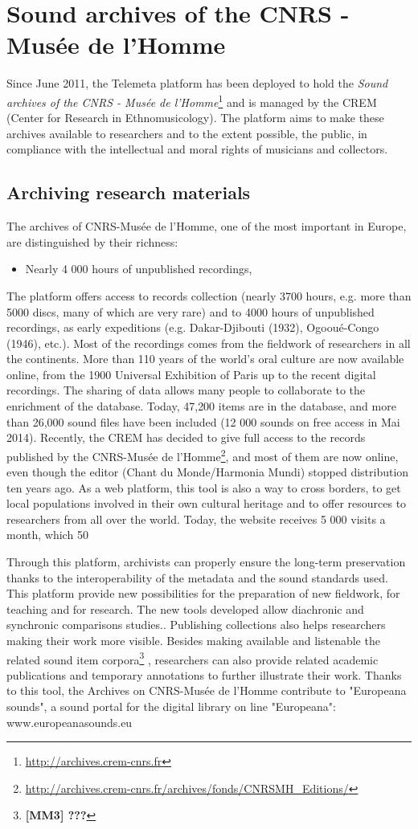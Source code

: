 \documentclass{sig-alternate}
\newcommand{\comment}[1]{\footnote{\color{red} \bf{{#1}}}}
\begin{document}
\section{Sound archives of the CNRS - Musée de l'Homme}\label{sec:archives-CREM}
Since June 2011, the Telemeta platform has been deployed to hold the \emph{Sound archives of the CNRS - Musée de l'Homme}\footnote{\url{http://archives.crem-cnrs.fr}} and is managed by the CREM (Center for Research in Ethnomusicology).
The platform aims to make these archives available to researchers and to the extent possible, the public, in compliance with the intellectual and moral rights of musicians and collectors.
\subsection{Archiving research materials}
The archives of CNRS-Musée de l’Homme, one of the most important in Europe, are distinguished by their richness:
\begin{itemize}
\item Nearly 4 000 hours of unpublished recordings,
\end{itemize}
The platform offers access to records collection (nearly 3700 hours, e.g. more than 5000 discs, many of which are very rare) and to 4000 hours of unpublished recordings, as early expeditions (e.g. Dakar-Djibouti (1932), Ogooué-Congo (1946), etc.). Most of the recordings comes from the fieldwork of researchers in all the continents. 
More than 110 years of the world's oral culture are now available online, from the 1900 Universal Exhibition of Paris up to the recent digital recordings. The sharing of data allows many people to collaborate to the enrichment of the database. Today, 47,200 items are in the database, and more than 26,000 sound files have been included (12 000 sounds on free access in Mai 2014). Recently, the CREM has decided to give full access to the records published by the CNRS-Musée de l’Homme\footnote{\url{http://archives.crem-cnrs.fr/archives/fonds/CNRSMH_Editions/}}, and most of them are now online, even though the editor (Chant du Monde/Harmonia Mundi) stopped distribution ten years ago. 
As a web platform, this tool is also a way to cross borders, to get local populations involved in their own cultural heritage and to offer resources to researchers from all over the world. Today, the website receives 5 000 visits a month, which 50%
 
Through this platform, archivists can properly ensure the long-term preservation thanks to the interoperability of the metadata and the sound standards used.
This platform provide new possibilities for the preparation of new fieldwork, for teaching and for research. The new tools developed allow diachronic and synchronic comparisons studies..
Publishing collections also helps researchers making their work more visible. Besides making available and listenable the related sound item corpora\comment{[MM3] ???} , researchers can also provide related academic publications and temporary annotations to further illustrate their work.
Thanks to this tool, the Archives on CNRS-Musée de l'Homme contribute to "Europeana sounds", a sound portal for the digital library on line "Europeana": www.europeanasounds.eu
\end{document}
